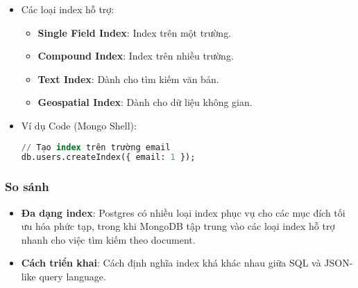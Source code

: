 \begin{itemize}
    \item Các loại index hỗ trợ:
    \begin{itemize}
        \item \textbf{Single Field Index}: Index trên một trường.
        \item \textbf{Compound Index}: Index trên nhiều trường.
        \item \textbf{Text Index}: Dành cho tìm kiếm văn bản.
        \item \textbf{Geospatial Index}: Dành cho dữ liệu không gian.
    \end{itemize}
    \item Ví dụ Code (Mongo Shell):\begin{lstlisting}[language=sql]
// Tạo index trên trường email
db.users.createIndex({ email: 1 });
\end{lstlisting}
\end{itemize}

\subsubsection{So sánh}

\begin{itemize}
    \item \textbf{Đa dạng index}: Postgres có nhiều loại index phục vụ cho các mục đích tối ưu hóa phức tạp, trong khi MongoDB tập trung vào các loại index hỗ trợ nhanh cho việc tìm kiếm theo document.
    \item \textbf{Cách triển khai}: Cách định nghĩa index khá khác nhau giữa SQL và JSON-like query language.
\end{itemize}